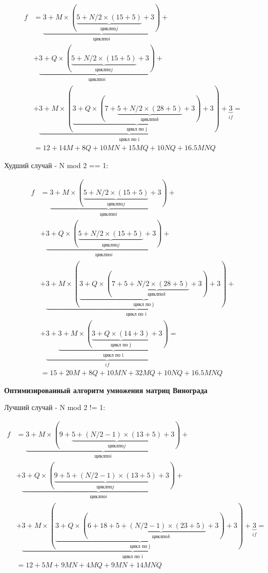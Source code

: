 \begin{equation}
    \begin{aligned}
    f &=
    \underbrace{3 + M \times (\underbrace{
    5 + N/2 \times (15+ 5)
    }_{цикл по j} + 3)}_{цикл по i} + \\
    &+ \underbrace{3 + Q \times (\underbrace{
    5 + N/2 \times (15+ 5)
    }_{цикл по j} + 3)}_{цикл по i} + \\
    &+ \underbrace{3 +M \times (\underbrace{3 + Q \times (7 + \underbrace{
    5 + N/2 \times (28 + 5)
    }_{цикл по k} + 3)}_{\text{цикл по j}} + 3)}_{\text{цикл по i}} +
    \underbrace{3}_{if} = \\
    &= 12+14M+8Q+10MN+15MQ+10NQ+16.5MNQ
    \end{aligned}
\end{equation}

Худший случай - N mod 2 == 1:

\begin{equation}
    \begin{aligned}
    f &=
    \underbrace{3 + M \times (\underbrace{
    5 + N/2 \times (15+ 5)
    }_{цикл по j} + 3)}_{цикл по i} + \\
    &+ \underbrace{3 + Q \times (\underbrace{
    5 + N/2 \times (15+ 5)
    }_{цикл по j} + 3)}_{цикл по i} + \\
    &+ \underbrace{3 + M \times (\underbrace{3 + Q \times (7 + \underbrace{
    5 + N/2 \times (28 + 5)
    }_{цикл по k} + 3)}_{\text{цикл по j}} + 3)}_{\text{цикл по i}} + \\
    &+ \underbrace{3 +
    \underbrace{3 + M \times (\underbrace{3 + Q \times (14 + 3)}_{\text{цикл по j}} + 3)}_{\text{цикл по i}}
    }_{if} = \\
    &= 15+20M+8Q+10MN+32MQ+10NQ+16.5MNQ
    \end{aligned}
\end{equation}

\textbf{Оптимизированный алгоритм умножения матриц Винограда}

Лучший случай - N mod 2 != 1:

\begin{equation}
    \begin{aligned}
    f &=
    \underbrace{3 + M \times (9 + \underbrace{
    5 + (N/2-1) \times (13 + 5)
    }_{цикл по j} + 3)}_{цикл по i} + \\
    &+ \underbrace{3 + Q \times (\underbrace{
    9 + 5 + (N/2-1) \times (13 + 5)
    }_{цикл по j} + 3)}_{цикл по i} + \\
    &+ \underbrace{3 + M \times (\underbrace{3 + Q \times (6 + 18 + \underbrace{
    5 + (N/2-1) \times (23 + 5)
    }_{цикл по k} + 3)}_{\text{цикл по j}} + 3)}_{\text{цикл по i}} +
    \underbrace{3}_{if} = \\
    &= 12+5M+9MN+4MQ+9MN+14MNQ
    \end{aligned}
\end{equation}

